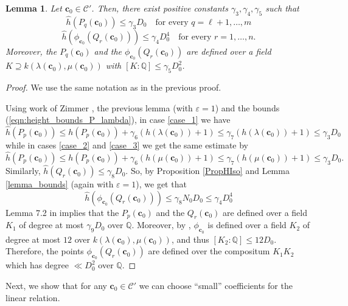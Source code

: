 \documentclass[11pt,a4paper,reqno]{amsart}
\numberwithin{equation}{section}
\newcommand{\Q}{\mathbb{Q}}
\renewcommand{\c}{\mathcal{C}}
\newcommand{\cc}{\mathbf{c}}
\newcommand{\g}{\gamma}
\newcommand{\eps}{\varepsilon}
\renewcommand{\l}{\lambda}
\newcommand{\m}{\mu}
\newcommand{\pt}[1]{\left( #1 \right)}
\newcommand{\pq}[1]{\left[ #1 \right]}
\newcommand{\quotes}[1]{``#1''}
\newtheorem{lemma}[theorem]{Lemma}
\theoremstyle{remark}
\theoremstyle{definition}
\theoremstyle{definition}
\begin{document}
\begin{lemma}
Let $\cc_0 \in \c'$. Then, there exist positive constants $\g_3, \g_4, \g_5$ such that
$$\widehat{h}(P_q(\cc_0))\leq \g_3 D_0 \quad \text{for every } q={\ell+1}, \ldots, m$$
$$\widehat{h}(\phi_{\cc_0}(Q_r(\cc_0)))\leq \g_4 D_0^{4} \quad \text{for every } r=1, \ldots, n.$$
Moreover, the $P_q(\cc_0)$ and the $\phi_{\cc_0}(Q_r(\cc_0))$ are defined over a field $K\supseteq k(\l(\cc_0),\m(\cc_0))$ with $\pq{K:\Q}\leq \g_5 D_0^{2}$.
\end{lemma}
\begin{proof}
We use the same notation as in the previous proof.

Using work of Zimmer \cite[Theorem]{Zim76}, the previous lemma (with $\eps=1$) and the bounds (\ref{eqn:height_bounds_P_lambda}), in case \ref{case_1} we have 
$$\widehat{h}(P_p(\cc_0))\leq h(P_p(\cc_0))+\g_6\pt{h(\l(\cc_0))+1}\leq \g_7\pt{h(\l(\cc_0))+1} \leq \g_3 D_0$$
while in cases \ref{case_2} and \ref{case_3} we get the same estimate by
$$\widehat{h}(P_p(\cc_0))\leq h(P_p(\cc_0))+\g_6\pt{h(\m(\cc_0))+1}\leq \g_7\pt{h(\m(\cc_0))+1} \leq \g_3 D_0.$$
Similarly, $\widehat{h}(Q_r(\cc_0))\leq \g_8 D_0$. So, by Proposition \ref{PropHIso} and Lemma \ref{lemma_bounds} (again with $\eps=1$), we get that 
$$\widehat{h}(\phi_{\cc_0}(Q_r(\cc_0)))\leq \g_8 N_0 D_0 \leq \g_4 D_0^{4}$$
Lemma 7.2 in \cite{BC16} implies that the $P_p(\cc_0)$ and the $Q_r(\cc_0)$ are defined over a field $K_1$ of degree at most $\g_{9} D_0$ over $\Q$. Moreover, by \cite[Lemma 6.1]{MW90}, $\phi_{\cc_0}$ is defined over a field $K_2$ of degree at most $12$ over $k(\l(\cc_0),\m(\cc_0))$, and thus $[K_2: \Q] \leq 12 D_0$. 
Therefore, the points $\phi_{\cc_0}(Q_r(\cc_0))$ are defined over the compositum $K_1 K_2$ which has degree $\ll D_0^{2}$ over $\Q$.
\end{proof}

Next, we show that for any $\cc_0 \in \c'$ we can choose \quotes{small} coefficients for the linear relation. 
\end{document}
